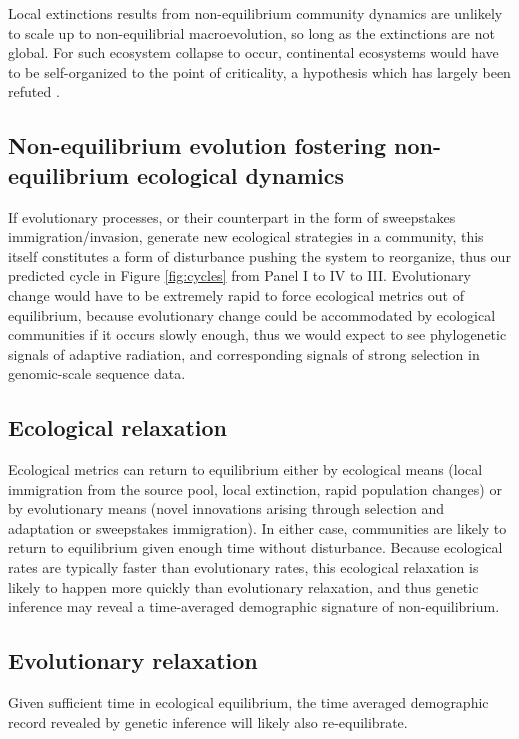 \documentclass[12pt]{article}
\begin{document}
Local extinctions results from non-equilibrium community dynamics are
unlikely to scale up to non-equilibrial macroevolution, so long as the
extinctions are not global. For such ecosystem collapse to occur,
continental ecosystems would have to be self-organized to the point of
criticality, a hypothesis which has largely been refuted
\citep{Kirchner1998-uk}.

\subsection{Non-equilibrium evolution fostering non-equilibrium ecological dynamics}

If evolutionary processes, or their counterpart in the form of
sweepstakes immigration/invasion, generate new ecological strategies
in a community, this itself constitutes a form of disturbance pushing
the system to reorganize, thus our predicted cycle in Figure
\ref{fig:cycles} from Panel I to IV to III.  Evolutionary change would
have to be extremely rapid to force ecological metrics out of
equilibrium, because evolutionary change could be accommodated by
ecological communities if it occurs slowly enough, thus we would
expect to see phylogenetic signals of adaptive radiation, and
corresponding signals of strong selection in genomic-scale sequence
data.

\subsection{Ecological relaxation}

Ecological metrics can return to equilibrium either by ecological
means (local immigration from the source pool, local extinction, rapid
population changes) or by evolutionary means (novel innovations
arising through selection and adaptation or sweepstakes
immigration). In either case, communities are likely to return to
equilibrium given enough time without disturbance. Because ecological
rates are typically faster than evolutionary rates, this ecological
relaxation is likely to happen more quickly than evolutionary
relaxation, and thus genetic inference may reveal a time-averaged
demographic signature of non-equilibrium.

\subsection{Evolutionary relaxation}

Given sufficient time in ecological equilibrium, the time averaged
demographic record revealed by genetic inference will likely also
re-equilibrate.
\end{document}
